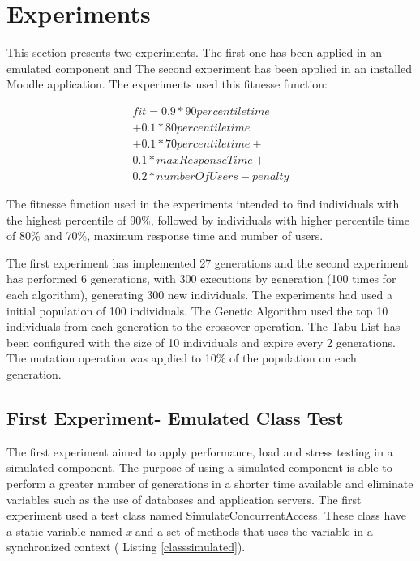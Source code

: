 \section{Experiments}

This section presents two experiments. The first one has been applied in an emulated component and The second experiment has been applied in an installed Moodle application. The experiments used this fitnesse function:

\begin{equation}
\begin{aligned}
fit=0.9* 90percentiletime\\
+0.1*80percentiletime\\+
0.1*70percentiletime+\\
0.1*maxResponseTime+\\
0.2*numberOfUsers-penalty
\end{aligned}
\end{equation}

The fitnesse function used in the experiments intended to find individuals with the highest percentile of 90\%, followed by individuals with higher percentile time of 80\% and 70\%, maximum response time and number of users.

The first experiment has implemented 27 generations and the second experiment has performed 6 generations, with 300 executions by generation (100 times for each algorithm),  generating 300 new individuals. The experiments had used a initial population of 100 individuals. The Genetic Algorithm used the top 10 individuals from each generation to the crossover operation. The Tabu List has been configured with the size of 10 individuals and expire every 2 generations.  The mutation operation was applied to 10\% of the population on each generation. 

\subsection{First Experiment- Emulated Class Test}

The first experiment aimed to apply performance, load and stress testing in a simulated component. The purpose of using a simulated component is able to perform a greater number of generations in a shorter time available and eliminate variables such as the use of databases and application servers. The first experiment used a test class  named SimulateConcurrentAccess. These class have a static variable named \textit{x} and a set of methods that uses the variable in a synchronized context ( Listing \ref{classsimulated}).

